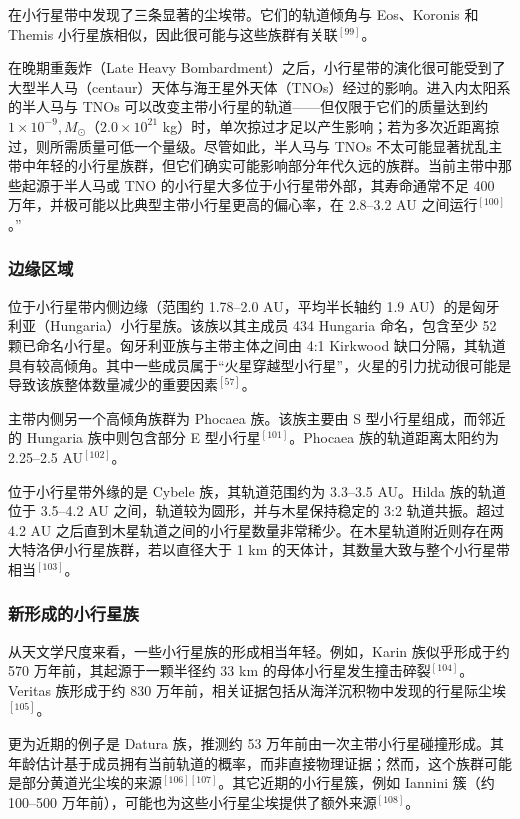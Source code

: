 在小行星带中发现了三条显著的尘埃带。它们的轨道倾角与 Eos、Koronis 和 Themis 小行星族相似，因此很可能与这些族群有关联$^{[99]}$。

在晚期重轰炸（Late Heavy Bombardment）之后，小行星带的演化很可能受到了大型半人马（centaur）天体与海王星外天体（TNOs）经过的影响。进入内太阳系的半人马与 TNOs 可以改变主带小行星的轨道——但仅限于它们的质量达到约 $1\times 10^{-9},M_{\odot}$（$2.0\times 10^{21}$ kg）时，单次掠过才足以产生影响；若为多次近距离掠过，则所需质量可低一个量级。尽管如此，半人马与 TNOs 不太可能显著扰乱主带中年轻的小行星族群，但它们确实可能影响部分年代久远的族群。当前主带中那些起源于半人马或 TNO 的小行星大多位于小行星带外部，其寿命通常不足 400 万年，并极可能以比典型主带小行星更高的偏心率，在 2.8–3.2 AU 之间运行$^{[100]}$。”
\subsubsection{边缘区域}
位于小行星带内侧边缘（范围约 1.78–2.0 AU，平均半长轴约 1.9 AU）的是匈牙利亚（Hungaria）小行星族。该族以其主成员 434 Hungaria 命名，包含至少 52 颗已命名小行星。匈牙利亚族与主带主体之间由 4:1 Kirkwood 缺口分隔，其轨道具有较高倾角。其中一些成员属于“火星穿越型小行星”，火星的引力扰动很可能是导致该族整体数量减少的重要因素$^{[57]}$。

主带内侧另一个高倾角族群为 Phocaea 族。该族主要由 S 型小行星组成，而邻近的 Hungaria 族中则包含部分 E 型小行星$^{[101]}$。Phocaea 族的轨道距离太阳约为 2.25–2.5 AU$^{[102]}$。

位于小行星带外缘的是 Cybele 族，其轨道范围约为 3.3–3.5 AU。Hilda 族的轨道位于 3.5–4.2 AU 之间，轨道较为圆形，并与木星保持稳定的 3:2 轨道共振。超过 4.2 AU 之后直到木星轨道之间的小行星数量非常稀少。在木星轨道附近则存在两大特洛伊小行星族群，若以直径大于 1 km 的天体计，其数量大致与整个小行星带相当$^{[103]}$。
\subsubsection{新形成的小行星族}
从天文学尺度来看，一些小行星族的形成相当年轻。例如，Karin 族似乎形成于约 570 万年前，其起源于一颗半径约 33 km 的母体小行星发生撞击碎裂$^{[104]}$。Veritas 族形成于约 830 万年前，相关证据包括从海洋沉积物中发现的行星际尘埃$^{[105]}$。

更为近期的例子是 Datura 族，推测约 53 万年前由一次主带小行星碰撞形成。其年龄估计基于成员拥有当前轨道的概率，而非直接物理证据；然而，这个族群可能是部分黄道光尘埃的来源$^{[106][107]}$。其它近期的小行星簇，例如 Iannini 簇（约 100–500 万年前），可能也为这些小行星尘埃提供了额外来源$^{[108]}$。
